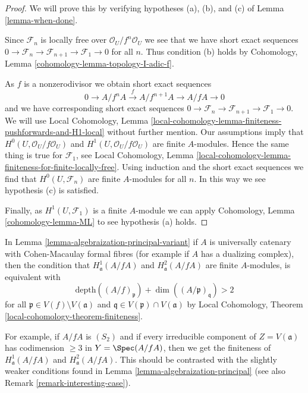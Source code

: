 \begin{proof}
We will prove this by verifying hypotheses (a), (b), and (c) of
Lemma \ref{lemma-when-done}.

\medskip\noindent
Since $\mathcal{F}_n$ is locally free over $\mathcal{O}_U/f^n\mathcal{O}_U$
we see that we have short exact sequences
$0 \to \mathcal{F}_n \to \mathcal{F}_{n + 1} \to \mathcal{F}_1 \to 0$
for all $n$. Thus condition (b) holds by
Cohomology, Lemma \ref{cohomology-lemma-topology-I-adic-f}.

\medskip\noindent
As $f$ is a nonzerodivisor we obtain short exact sequences
$$
0 \to A/f^nA \xrightarrow{f} A/f^{n + 1}A \to A/fA \to 0
$$
and we have corresponding short exact sequences
$0 \to \mathcal{F}_n \to \mathcal{F}_{n + 1} \to \mathcal{F}_1 \to 0$.
We will use
Local Cohomology, Lemma
\ref{local-cohomology-lemma-finiteness-pushforwards-and-H1-local}
without further mention. Our assumptions imply that
$H^0(U, \mathcal{O}_U/f\mathcal{O}_U)$ and
$H^1(U, \mathcal{O}_U/f\mathcal{O}_U)$
are finite $A$-modules. Hence the same thing is true for $\mathcal{F}_1$, see
Local Cohomology, Lemma
\ref{local-cohomology-lemma-finiteness-for-finite-locally-free}.
Using induction and the short exact sequences we find that
$H^0(U, \mathcal{F}_n)$ are finite $A$-modules for all $n$.
In this way we see hypothesis (c) is satisfied.

\medskip\noindent
Finally, as $H^1(U, \mathcal{F}_1)$ is a finite $A$-module
we can apply Cohomology, Lemma \ref{cohomology-lemma-ML}
to see hypothesis (a) holds.
\end{proof}

\begin{remark}
\label{remark-interesting-case-variant}
In Lemma \ref{lemma-algebraization-principal-variant}
if $A$ is universally catenary with Cohen-Macaulay
formal fibres (for example if $A$ has a dualizing complex), then
the condition that
$H^1_\mathfrak a(A/fA)$ and $H^2_\mathfrak a(A/fA)$
are finite $A$-modules, is equivalent with
$$
\text{depth}((A/f)_\mathfrak p) + \dim((A/\mathfrak p)_\mathfrak q) > 2
$$
for all $\mathfrak p \in V(f) \setminus V(\mathfrak a)$
and $\mathfrak q \in V(\mathfrak p) \cap V(\mathfrak a)$
by Local Cohomology, Theorem \ref{local-cohomology-theorem-finiteness}.

\medskip\noindent
For example, if $A/fA$ is $(S_2)$ and if every irreducible
component of $Z = V(\mathfrak a)$ has codimension $\geq 3$
in $Y = \Spec(A/fA)$, then we get the finiteness of
$H^1_\mathfrak a(A/fA)$ and $H^2_\mathfrak a(A/fA)$.
This should be contrasted with the slightly weaker conditions
found in Lemma \ref{lemma-algebraization-principal}
(see also Remark \ref{remark-interesting-case}).
\end{remark}







